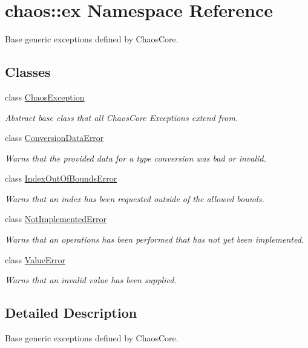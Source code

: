 \hypertarget{namespacechaos_1_1ex}{}\section{chaos\+:\+:ex Namespace Reference}
\label{namespacechaos_1_1ex}


Base generic exceptions defined by Chaos\+Core.  


\subsection*{Classes}
\begin{DoxyCompactItemize}
\item 
class \hyperlink{classchaos_1_1ex_1_1_chaos_exception}{Chaos\+Exception}
\begin{DoxyCompactList}\small\item\em Abstract base class that all Chaos\+Core Exceptions extend from. \end{DoxyCompactList}\item 
class \hyperlink{classchaos_1_1ex_1_1_conversion_data_error}{Conversion\+Data\+Error}
\begin{DoxyCompactList}\small\item\em Warns that the provided data for a type conversion was bad or invalid. \end{DoxyCompactList}\item 
class \hyperlink{classchaos_1_1ex_1_1_index_out_of_bounds_error}{Index\+Out\+Of\+Bounds\+Error}
\begin{DoxyCompactList}\small\item\em Warns that an index has been requested outside of the allowed bounds. \end{DoxyCompactList}\item 
class \hyperlink{classchaos_1_1ex_1_1_not_implemented_error}{Not\+Implemented\+Error}
\begin{DoxyCompactList}\small\item\em Warns that an operations has been performed that has not yet been implemented. \end{DoxyCompactList}\item 
class \hyperlink{classchaos_1_1ex_1_1_value_error}{Value\+Error}
\begin{DoxyCompactList}\small\item\em Warns that an invalid value has been supplied. \end{DoxyCompactList}\end{DoxyCompactItemize}


\subsection{Detailed Description}
Base generic exceptions defined by Chaos\+Core. 